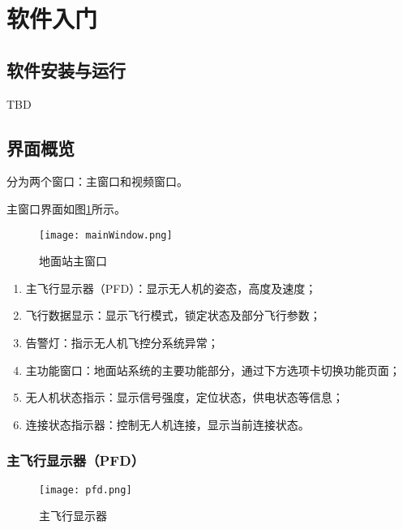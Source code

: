 \section{软件入门}
\subsection{软件安装与运行}
TBD

\subsection{界面概览}
\csciname 分为两个窗口：主窗口和视频窗口。

主窗口界面如图\ref{fmainwin}所示。

\begin{figure}[ht]
	\begin{center}
		\texttt{[image: mainWindow.png]}
		\caption{地面站主窗口}
		\label{fmainwin}
	\end{center}
\end{figure}

\begin{enumerate}[label=\arabic*.,topsep=0pt]
\setlength{\itemsep}{-2pt}
\item 主飞行显示器（PFD）：显示无人机的姿态，高度及速度；
\item 飞行数据显示：显示飞行模式，锁定状态及部分飞行参数；
\item 告警灯：指示无人机飞控分系统异常；
\item 主功能窗口：地面站系统的主要功能部分，通过下方选项卡切换功能页面；
\item 无人机状态指示：显示信号强度，定位状态，供电状态等信息；
\item 连接状态指示器：控制无人机连接，显示当前连接状态。
\end{enumerate}

\clearpage

\subsubsection{主飞行显示器（PFD）}

\begin{figure}[ht]
	\begin{center}
		\texttt{[image: pfd.png]}
		\caption{主飞行显示器}
		\label{fpfd}
	\end{center}
\end{figure}

